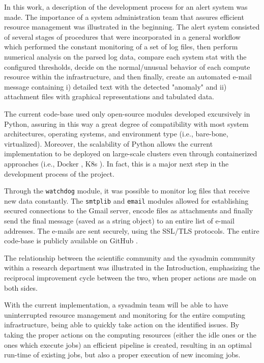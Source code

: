 \documentclass[conference]{IEEEtran}
\begin{document}
In this work, a description of the development process for an alert system was made. The importance of a system administration team that assures efficient resource management was illustrated in the beginning. The alert system consisted of several stages of procedures that were incorporated in a general workflow which performed the constant monitoring of a set of log files, then perform numerical analysis on the parsed log data, compare each system stat with the configured thresholds, decide on the normal/unusual behavior of each compute resource within the infrastructure, and then finally, create an automated e-mail message containing i) detailed text with the detected "anomaly" and ii) attachment files with graphical representations and tabulated data.
\par The current code-base used only open-source modules developed excursively in Python, assuring in this way a great degree of compatibility with most system architectures, operating systems, and environment type (i.e., bare-bone, virtualized). Moreover, the scalability of Python allows the current implementation to be deployed on large-scale clusters even through containerized approaches (i.e., Docker \cite{merkel2014docker}, K8s \cite{brewer2015kubernetes}). In fact, this is a major next step in the development process of the project.
\par Through the \texttt{watchdog} module, it was possible to monitor log files that receive new data constantly. The \texttt{smtplib} and \texttt{email} modules allowed for establishing secured connections to the Gmail server, encode files as attachments and finally send the final message (saved as a string object) to an entire list of e-mail addresses. The e-mails are sent securely, using the SSL/TLS protocols. The entire code-base is publicly available on GitHub \cite{github-codebase}.
\par The relationship between the scientific community and the sysadmin community within a research department was illustrated in the Introduction, emphasizing the reciprocal improvement cycle between the two, when proper actions are made on both sides.
\par With the current implementation, a sysadmin team will be able to have uninterrupted resource management and monitoring for the entire computing infrastructure, being able to quickly take action on the identified issues. By taking the proper actions on the computing resources (either the idle ones or the ones which execute jobs) an efficient pipeline is created, resulting in an optimal run-time of existing jobs, but also a proper execution of new incoming jobs.
\end{document}
